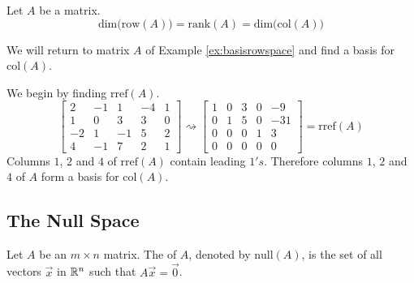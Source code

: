 \documentclass{ximera}
\begin{document}
\begin{theorem}\label{th:dimroweqdimcoleqrank}
Let $A$ be a matrix.
$$\mbox{dim}\Big(\mbox{row}(A)\Big)=\mbox{rank}(A)=\mbox{dim}\Big(\mbox{col}(A)\Big)$$
\end{theorem}

\begin{example}\label{ex:basiscolspace}
We will return to matrix $A$ of Example \ref{ex:basisrowspace} and find a basis for $\mbox{col}(A)$.
\begin{explanation}
We begin by finding $\mbox{rref}(A)$.
$$\begin{bmatrix}2&-1&1&-4&1\\1&0&3&3&0\\-2&1&-1&5&2\\4&-1&7&2&1\end{bmatrix}\rightsquigarrow\begin{bmatrix}1&0&3&0&-9\\0&1&5&0&-31\\0&0&0&1&3\\0&0&0&0&0\end{bmatrix}=\mbox{rref}(A)$$
Columns $1$, $2$ and $4$ of $\mbox{rref}(A)$ contain leading $1's$.  Therefore columns $1$, $2$ and $4$ of $A$ form a basis for $\mbox{col}(A)$.
\end{explanation}

\end{example}

\subsection*{The Null Space}
\begin{definition}\label{def:nullspace} Let $A$ be an $m\times n$ matrix.  The  of $A$, denoted by $\mbox{null}(A)$, is the set of all vectors $\vec{x}$ in $\mathbb{R}^n$ such that $A\vec{x}=\vec{0}$.
\end{definition}
\end{document}
